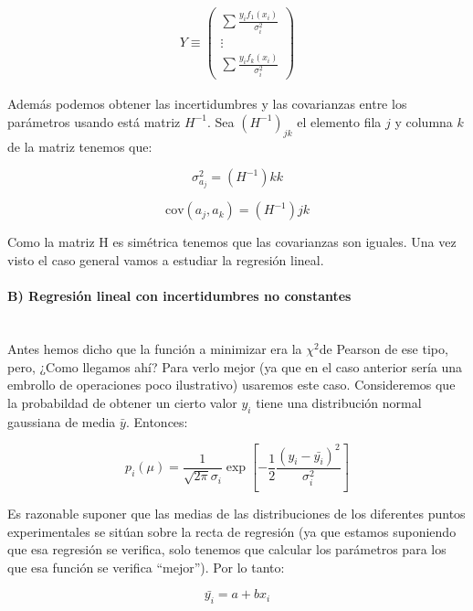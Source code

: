 \documentclass[12pt,a4paper]{book}
\newcommand{\cov}{\mathrm{cov}}
\newcommand{\chii}{$\chi^2$}
\begin{document}
\begin{gather}
Y \equiv \left( 
\begin{array}{c}
\sum \frac{y_i f_1 (x_i)}{\sigma_i^2}  \\
\vdots \\
\sum \frac{y_i f_k (x_i)}{\sigma_i^2} 
\end{array}
\right)
\end{gather}

Además podemos obtener las incertidumbres y las covarianzas entre los parámetros usando está matriz $H^{-1}$. Sea $(H^{-1})_{jk}$ el elemento fila $j$ y columna $k$ de la matriz tenemos que:

\begin{equation}
\sigma_{a_j}^2 = (H^{-1}){kk}
\end{equation}

\begin{equation}
\cov (a_j, a_k) = (H^{-1}){jk}
\end{equation}

Como la matriz H es simétrica tenemos que las covarianzas son iguales. Una vez visto el caso general vamos a estudiar la regresión lineal. 

\paragraph{B) Regresión lineal con incertidumbres no constantes\\ \\}

Antes hemos dicho que la función a minimizar era la \chii de Pearson de ese tipo, pero, ¿Como llegamos ahí? Para verlo mejor (ya que en el caso anterior sería una embrollo de operaciones poco ilustrativo) usaremos este caso. Consideremos que la probabildad de obtener un cierto valor $y_i$ tiene una distribución normal gaussiana de media $\bar{y}$. Entonces:


\begin{equation}
p_i (\mu) = \dfrac{1}{\sqrt{2 \pi} \sigma_i} \exp \left[ -\dfrac{1}{2} \dfrac{(y_i - \bar{y_i})^2}{\sigma_i^2} \right]
\end{equation}

Es razonable suponer que las medias de las distribuciones de los diferentes puntos experimentales se sitúan sobre la recta de regresión (ya que estamos suponiendo que esa regresión se verifica, solo tenemos que calcular los parámetros para los que esa función se verifica ``mejor''). Por lo tanto:

\begin{equation}
\bar{y_i} = a + bx_i
\end{equation}
\end{document}
